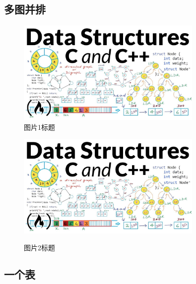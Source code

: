 \documentclass{resume/dhuBachelorclass}
\begin{document}
\subsection{多图并排}

\begin{figure}[H]
    \centering
    \begin{minipage}[c]{0.40\textwidth} %
    \centering
    \includegraphics[width=0.8\textwidth]{assets/dataStructures.jpg}\\
    \caption{图片1标题}
    \end{minipage}
    \hspace{1em}
    \begin{minipage}[c]{0.40\textwidth} %
    \centering
    \includegraphics[width=0.8\textwidth]{assets/dataStructures.jpg}\\
    \caption{图片2标题}
    \end{minipage}
\end{figure}

\subsection{一个表}
\end{document}
